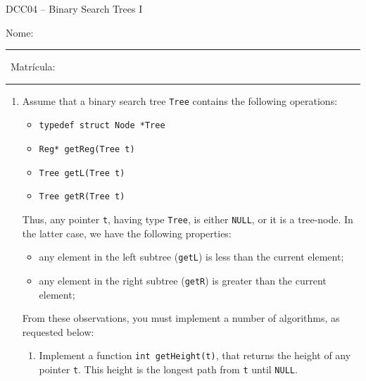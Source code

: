 \documentclass[12pt]{article}
\begin{document}
\begin{center}
\Large{DCC04 -- Binary Search Trees I}
\end{center}

\vspace{1cm}

\noindent
Nome: \rule{8cm}{0.01in} \ Matr\'{i}cula: \rule{3cm}{0.01in}

\vspace{1cm}


\begin{enumerate}

\item Assume that a binary search tree \texttt{Tree} contains the following
operations:

\begin{itemize}
\item \texttt{typedef struct Node *Tree}

\item \texttt{Reg* getReg(Tree t)}

\item \texttt{Tree getL(Tree t)}

\item \texttt{Tree getR(Tree t)}
\end{itemize}

Thus, any pointer \texttt{t}, having type \texttt{Tree}, is either \texttt{NULL},
or it is a tree-node.
In the latter case, we have the following properties:

\begin{itemize}
\item any element in the left subtree (\texttt{getL}) is less than the 
current element;
\item any element in the right subtree (\texttt{getR}) is greater than the 
current element;
\end{itemize}

From these observations, you must implement a number of algorithms, as requested
below:

\begin{enumerate}
\item Implement a function \texttt{int getHeight(t)}, that returns the height of
any pointer \texttt{t}.
This height is the longest path from \texttt{t} until \texttt{NULL}.

\vspace{5cm}


\end{enumerate}
\end{enumerate}
\end{document}
